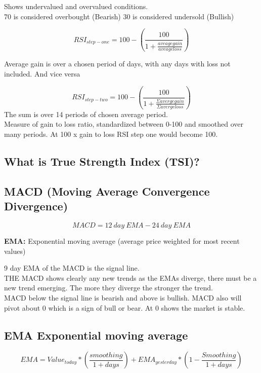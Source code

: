 \documentclass[11pt]{scrartcl} %
\begin{document}
Shows undervalued and overvalued conditions.\\

70 is considered overbought (Bearish)
30 is considered undersold (Bullish)

\[ RSI_{step-one} = 100 - (\frac{100}{1+\frac{aveage gain}{aveage loss}}) \]

Average gain is over a chosen period of days, with any days with loss not included. And vice versa

\[ RSI_{step-two} = 100 - (\frac{100}{1+ \frac{\Sigma avergegain}{\Sigma averge loss}}) \]
The sum is over 14 periods of chosen average period.\\

Measure of gain to loss ratio, standardized between 0-100 and smoothed over many periods. At 100 x gain to loss RSI step one would become 100.

\subsection{What is True Strength Index (TSI)?}



\subsection{MACD (Moving Average Convergence Divergence)}

\[ MACD = 12\:day\:EMA - 24\:day\:EMA \] 

\textbf{EMA:} Exponential moving average (average price weighted for most recent values)

9 day EMA of the MACD is the signal line.\\

THE MACD shows clearly any new trends as the EMAs diverge, there must be a new trend emerging. The 
more they diverge the stronger the trend.\\

MACD below the signal line is bearish and above is bullish. MACD also will pivot about 0 which is a sign
of bull or bear. At 0 shows the market is stable.

\subsection{EMA Exponential moving average}

\[ EMA = Value_{today} *(\frac{smoothing}{1 + days}) + EMA_{yesterday}*(1-\frac{Smoothing}{1+days}) \]
\end{document}
